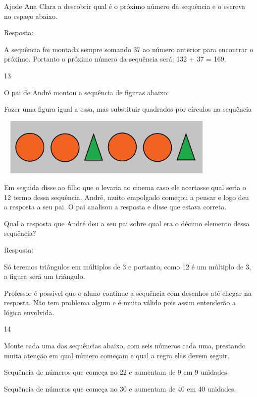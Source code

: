 \begin{escolha}
Ajude Ana Clara a descobrir qual é o próximo número da sequência e o
escreva no espaço abaixo.


Resposta:

A sequência foi montada sempre somando 37 ao número anterior para
encontrar o próximo. Portanto o próximo número da sequência será: 132 +
37 = 169.

\num{13}

O pai de André montou a sequência de figuras abaixo:

Fazer uma figura igual a essa, mas substituir quadrados por círculos na
sequência

\includegraphics[width=4.30871in,height=1.10010in]{media/image36.png}

Em seguida disse ao filho que o levaria ao cinema caso ele acertasse
qual seria o 12 termo dessa sequência. André, muito empolgado começou a
pensar e logo deu a resposta a seu pai. O pai analisou a resposta e
disse que estava correta.

Qual a resposta que André deu a seu pai sobre qual era o décimo elemento
dessa sequência?


Resposta:

Só teremos triângulos em múltiplos de 3 e portanto, como 12 é um
múltiplo de 3, a figura será um triângulo.

Professor é possível que o aluno continue a sequência com desenhos até
chegar na resposta. Não tem problema algum e é muito válido pois assim
entenderão a lógica envolvida.

\num{14}

Monte cada uma das sequências abaixo, com seis números cada uma,
prestando muita atenção em qual número começam e qual a regra elas devem
seguir.

\begin{escolha}

  \item
  Sequência de números que começa no 22 e aumentam de 9 em 9 unidades.

\item
  Sequência de números que começa no 30 e aumentam de 40 em 40 unidades.


\end{escolha}
\end{escolha}
